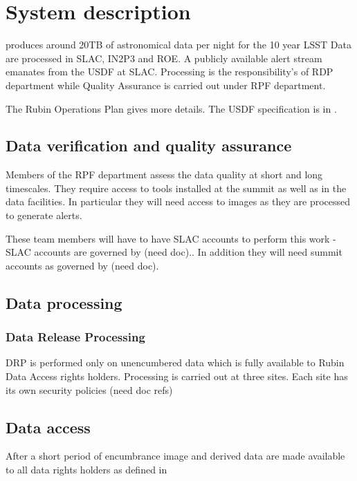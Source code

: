 \section{System description}

\VRO produces around 20TB of astronomical data per night for the 10 year \gls{LSST}
Data are processed in \gls{SLAC}, \gls{IN2P3} and ROE.
A publicly available alert stream emanates from the \gls{USDF} at \gls{SLAC}.
Processing is the responsibility's of \gls{RDP} department while Quality Assurance is carried out under \gls{RPF} department.

The Rubin \gls{Operations} Plan  gives more details.
The USDF specification is in .



\subsection{Data verification and quality assurance }
Members of the \gls{RPF} department assess the data quality at short and long timescales.
They require access to tools installed at the summit as well as in the data facilities.
In particular they will need access to images as they are processed to generate alerts.

These team members will have to have \gls{SLAC} accounts to perform this work - \gls{SLAC} accounts are governed by (need doc)..
In addition they will need summit accounts as governed by (need doc).



\subsection{Data processing}
\subsubsection{Data Release Processing}
DRP is performed only on unencumbered data which is fully available to Rubin Data Access rights holders.
Processing is carried out at three sites.
Each site has its own security policies (need doc refs) 


\subsection{Data access}
After a short period of encumbrance image and derived data are made available to all
data rights holders as defined in 



